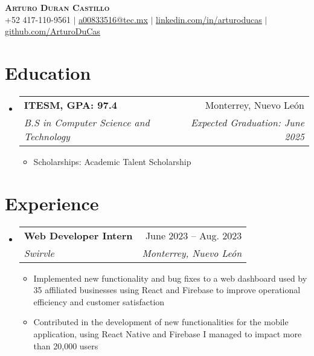 \documentclass[letterpaper,11pt]{article}
\makeatletter
\newcommand{\resumeItem}[1]{
    \item\small{
            {#1 \vspace{-2pt}}
    }
}
\newcommand{\resumeSubheading}[4]{
    \vspace{-2pt}\item
    \begin{tabular*}{0.97\textwidth}[t]{l@{\extracolsep{\fill}}r}
        \textbf{#1} & #2 \\
        \textit{\small#3} & \textit{\small #4} \\
    \end{tabular*}\vspace{-7pt}
}
\newcommand{\resumeSubHeadingListStart}{\begin{itemize}[leftmargin=0.15in, label={}]}
\newcommand{\resumeSubHeadingListEnd}{\end{itemize}}
\newcommand{\resumeItemListStart}{\begin{itemize}}
\newcommand{\resumeItemListEnd}{\end{itemize}\vspace{-5pt}}
\makeatother
\begin{document}

\begin{center}
\textbf{\Huge \scshape Arturo Duran Castillo} \\ \vspace{1pt}
\small +52 417-110-9561 $|$ \href{mailto:a00833516@tec.mx}{\underline{a00833516@tec.mx}} $|$
\href{https://www.linkedin.com/in/arturoducas/}{\underline{linkedin.com/in/arturoducas}} $|$
\href{https://github.com/ArturoDuCas}{\underline{github.com/ArturoDuCas}}
\end{center}


\section{Education}
\resumeSubHeadingListStart
\resumeSubheading
{ITESM, GPA: 97.4}{Monterrey, Nuevo León}
{B.S in Computer Science and Technology}{Expected Graduation: June 2025}
\resumeItemListStart
\resumeItem{Scholarships: Academic Talent Scholarship}
\resumeItemListEnd
\resumeSubHeadingListEnd



\section{Experience}
\resumeSubHeadingListStart
\resumeSubheading
{Web Developer Intern}{June 2023 -- Aug. 2023}
{Swirvle}{Monterrey, Nuevo León}
\resumeItemListStart
\resumeItem{Implemented new functionality and bug fixes to a web dashboard used by 35 affiliated businesses using React and Firebase to improve operational efficiency and customer satisfaction}
\resumeItem{Contributed in the development of new functionalities for the mobile application, using React Native and Firebase I managed to impact more than 20,000 users}
\resumeItemListEnd

\resumeSubHeadingListEnd
\end{document}
